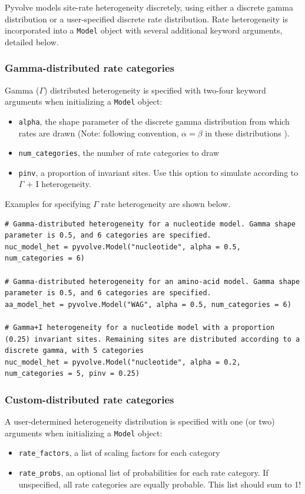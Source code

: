 \documentclass{article}
\newcommand{\code}[1]{\texttt{\small{#1}}}
\begin{document}
Pyvolve models site-rate heterogeneity discretely, using either a discrete gamma distribution or a user-specified discrete rate distribution. Rate heterogeneity is incorporated into a \code{Model} object with several additional keyword arguments, detailed below. 


\subsubsection{Gamma-distributed rate categories}

Gamma ($\Gamma$) distributed heterogeneity is specified with two-four keyword arguments when initializing a \code{Model} object:
\begin{itemize}
	\item \code{alpha}, the shape parameter of the discrete gamma distribution from which rates are drawn (Note: following convention, $\alpha = \beta$ in these distributions \citep{Yang2006}).
	\item \code{num\_categories}, the number of rate categories to draw
	\item \code{pinv}, a proportion of invariant sites. Use this option to simulate according to $\Gamma$ + I heterogeneity.
\end{itemize}

Examples for specifying $\Gamma$ rate heterogeneity are shown below.

\begin{lstlisting}
# Gamma-distributed heterogeneity for a nucleotide model. Gamma shape parameter is 0.5, and 6 categories are specified.
nuc_model_het = pyvolve.Model("nucleotide", alpha = 0.5, num_categories = 6)

# Gamma-distributed heterogeneity for an amino-acid model. Gamma shape parameter is 0.5, and 6 categories are specified. 
aa_model_het = pyvolve.Model("WAG", alpha = 0.5, num_categories = 6)

# Gamma+I heterogeneity for a nucleotide model with a proportion (0.25) invariant sites. Remaining sites are distributed according to a discrete gamma, with 5 categories
nuc_model_het = pyvolve.Model("nucleotide", alpha = 0.2, num_categories = 5, pinv = 0.25)
\end{lstlisting}


\subsubsection{Custom-distributed rate categories}

A user-determined heterogeneity distribution is specified with one (or two) arguments when initializing a \code{Model} object:
\begin{itemize}
	\item \code{rate\_factors}, a list of scaling factors for each category
	\item \code{rate\_probs}, an optional list of probabilities for each rate category. If unspecified, all rate categories are equally probable. This list should sum to 1!
\end{itemize}
\end{document}
